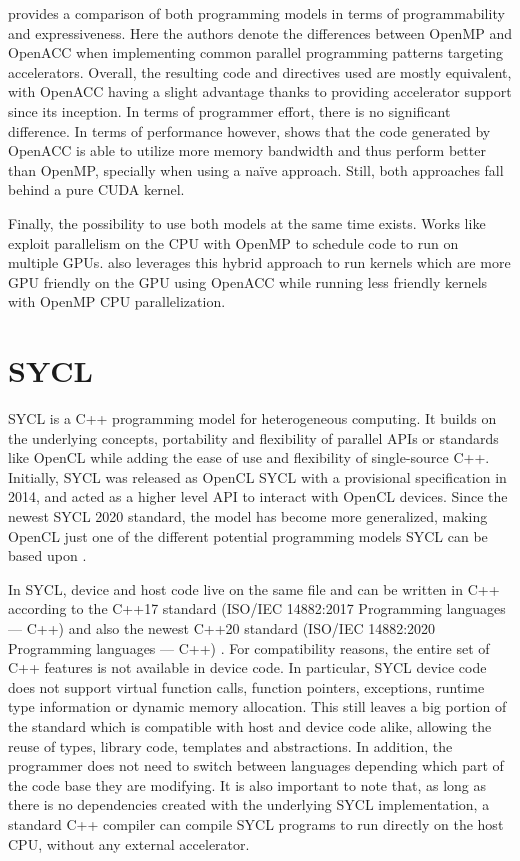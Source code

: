 \cite{openmp_vs_openacc} provides a comparison of both programming models in terms of programmability and expressiveness. Here the authors denote the differences between OpenMP and OpenACC when implementing common parallel programming patterns targeting accelerators. Overall, the resulting code and directives used are mostly equivalent, with OpenACC having a slight advantage thanks to providing accelerator support since its inception. In terms of programmer effort, there is no significant difference. In terms of performance however, \cite{cuda_openacc_openmp_performance} shows that the code generated by OpenACC is able to utilize more memory bandwidth and thus perform better than OpenMP, specially when using a naïve approach. Still, both approaches fall behind a pure CUDA kernel.

Finally, the possibility to use both models at the same time exists. Works like \cite{openmp_openacc_multigpus} exploit parallelism on the CPU with OpenMP to schedule code to run on multiple GPUs. \cite{openmp_openacc_molecular_docking} also leverages this hybrid approach to run kernels which are more GPU friendly on the GPU using OpenACC while running less friendly kernels with OpenMP CPU parallelization.

\section{SYCL}
SYCL \cite{sycl_2020_standard} is a C++ programming model for heterogeneous computing. It builds on the underlying concepts, portability and flexibility of parallel APIs or standards like OpenCL while adding the ease of use and flexibility of single-source C++. Initially, SYCL was released as OpenCL SYCL with a provisional specification in 2014, and acted as a higher level API to interact with OpenCL devices. Since the newest SYCL 2020 standard, the model has become more generalized, making OpenCL just one of the different potential programming models SYCL can be based upon \cite{sycl_faq}.

In SYCL, device and host code live on the same file and can be written in C++ according to the C++17 standard (ISO/IEC 14882:2017 Programming languages — C++) \cite{cpp17} and also the newest C++20 standard (ISO/IEC 14882:2020 Programming languages — C++) \cite{cpp20}. For compatibility reasons, the entire set of C++ features is not available in device code. In particular, SYCL device code does not support virtual function calls, function pointers, exceptions, runtime type information or dynamic memory allocation.  This still leaves a big portion of the standard which is compatible with host and device code alike, allowing the reuse of types, library code, templates and abstractions. In addition, the programmer does not need to switch between languages depending which part of the code base they are modifying. It is also important to note that, as long as there is no dependencies created with the underlying SYCL implementation, a standard C++ compiler can compile SYCL programs to run directly on the host CPU, without any external accelerator.

